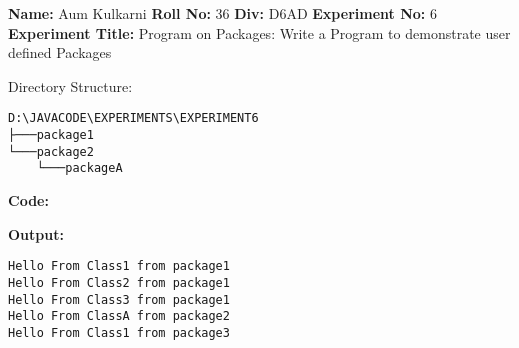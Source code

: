 \documentclass{article}
\begin{document}
\hfill \break
{\huge\textbf{Name:}} {\huge Aum Kulkarni}\newline
\hfill \break
{\huge\textbf{Roll No:} 36}\newline
\hfill \break
{\huge\textbf{Div:} D6AD}\newline
\hfill \break
{\huge\textbf{Experiment No:} 6}\newline
\hfill \break
{\huge\textbf{Experiment Title:} Program on Packages:\newline
Write a Program to demonstrate user defined Packages}

\newpage
Directory Structure:
\begin{verbatim}
D:\JAVACODE\EXPERIMENTS\EXPERIMENT6
├───package1
└───package2
    └───packageA
\end{verbatim}
\textbf{Code:}
\hfill \break
{}\hfill \break
{}\hfill \break
{}\hfill \break
\newpage
{}\hfill \break
{}

\textbf{Output:}
\begin{verbatim}
Hello From Class1 from package1
Hello From Class2 from package1
Hello From Class3 from package1
Hello From ClassA from package2
Hello From Class1 from package3
\end{verbatim}
\end{document}
